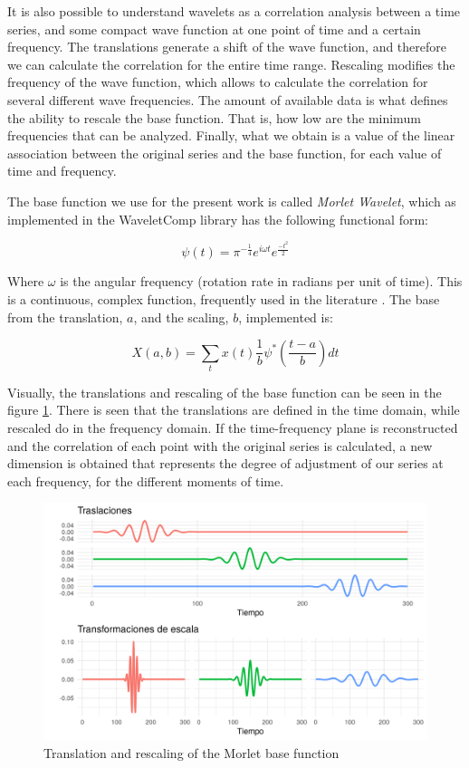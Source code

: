 \documentclass[a4paper]{article}
\begin{document}
It is also possible to understand wavelets as a correlation  analysis between a time series, and some compact wave function at one point of time and a certain frequency. The translations generate a shift of the wave function, and therefore we can calculate the correlation for the entire time range. Rescaling modifies the frequency of the wave function, which allows to calculate the correlation for several different wave frequencies. The amount of available data is what defines the ability to rescale the base function. That is, how low are the minimum frequencies that can be analyzed. Finally, what we obtain is a value of the linear association between the original series and the base function, for each value of time and frequency.

The base function we use for the present work is called \textit{Morlet Wavelet}, which as implemented in the WaveletComp \citep{Roesch2018} library has the following functional form:

$$
\psi(t)=\pi^{-\frac{1}{4}}e^{i\omega t}e^{\frac{-t^2}{2}}
$$


Where $\omega$ is the angular frequency (rotation rate in radians per unit of time). This is a continuous, complex function, frequently used in the literature \citep{conraria2011continuous}. The base from the translation, $a$, and the scaling, $b$, implemented is:

$$
X(a,b)=\sum_{t} x(t)   \frac{1}{b} \psi^*\left(\frac{t-a}{b}\right)dt
$$

Visually, the translations and rescaling of the base function can be seen in the figure \ref{fig:morlet}. There is seen that the translations are defined in the time domain, while rescaled do in the frequency domain. If the time-frequency plane is reconstructed and the correlation of each point with the original series is calculated, a new dimension is obtained that represents the degree of adjustment of our series at each frequency, for the different moments of time.

\begin{figure}[H]
	\centering
	\includegraphics[width=\linewidth]{morelt.png}
	\caption{Translation and rescaling of the Morlet base function} \label{fig:morlet}
\end{figure}
\end{document}
